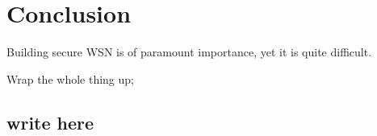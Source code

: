 \documentclass[conference,final]{IEEEtran}
\begin{document}


\section{Conclusion}
\label{sec:conc}
Building secure WSN is of paramount importance, yet it is quite difficult.


Wrap the whole thing up;
\subsection{write here}


\end{document}
